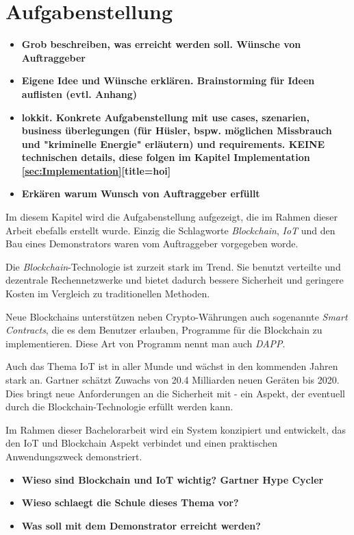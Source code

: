 \chapter{Aufgabenstellung}
\label{cha:Aufgabenstellung}
\begin{itemize}
    \item \textbf{Grob beschreiben, was erreicht werden soll. Wünsche von Auftraggeber}
    \item \textbf{Eigene Idee und Wünsche erklären. Brainstorming für Ideen auflisten (evtl. Anhang)}
    \item \textbf{lokkit. Konkrete Aufgabenstellung mit use cases, szenarien, business überlegungen (für Hüsler, bspw. möglichen Missbrauch und "kriminelle Energie" erläutern) und requirements. KEINE technischen details, diese folgen im Kapitel Implementation \ref{sec:Implementation}[title=hoi]}
    \item \textbf{Erkären warum Wunsch von Auftraggeber erfüllt}
\end{itemize}

Im diesem Kapitel wird die Aufgabenstellung aufgezeigt, die im Rahmen dieser Arbeit ebefalls erstellt wurde. Einzig die Schlagworte \emph{Blockchain}, \emph{\acrfull{IoT}} und den Bau eines Demonstrators waren vom Auftraggeber vorgegeben worde.

Die \emph{Blockchain}-Technologie ist zurzeit stark im Trend. Sie benutzt verteilte und dezentrale Rechennetzwerke und bietet dadurch bessere Sicherheit und geringere  Kosten im Vergleich zu traditionellen Methoden.

Neue Blockchains unterstützen neben Crypto-Währungen auch sogenannte \emph{Smart Contracts}, die es dem Benutzer erlauben, Programme für die Blockchain zu implementieren. Diese Art von Programm nennt man auch \emph{\acrfull{DAPP}}.

Auch das Thema \acrshort{IoT} ist in aller Munde und wächst in den kommenden Jahren stark an. Gartner schätzt Zuwachs von 20.4 Milliarden neuen Geräten bis 2020. Dies bringt neue Anforderungen an die Sicherheit mit - ein Aspekt, der eventuell durch die Blockchain-Technologie erfüllt werden kann.\cite{gartner.com_iot}

Im Rahmen dieser Bachelorarbeit wird ein System konzipiert und entwickelt, das den IoT und Blockchain Aspekt verbindet und einen praktischen Anwendungszweck demonstriert.

\begin{itemize}
    \item \textbf{ Wieso sind Blockchain und IoT wichtig? Gartner Hype Cycler}
    \item \textbf{ Wieso schlaegt die Schule dieses Thema vor? }
    \item \textbf{ Was soll mit dem Demonstrator erreicht werden? }
\end{itemize}


